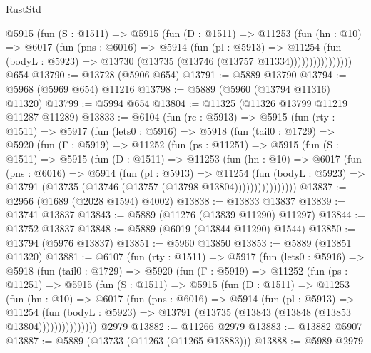 \begin{lexlean}{RustStd}
\begin{coremodule}
                @5915
                  (fun (S : @1511) =>
                  @5915
                    (fun (D : @1511) =>
                    @11253
                      (fun (hn : @10) =>
                      @6017
                        (fun (pns : @6016) =>
                        @5914
                          (fun (pl : @5913) =>
                          @11254
                            (fun (bodyL : @5923) =>
                            @13730 (@13735 (@13746 (@13757 @11334))))))))))))))))
    @654
@13790 := @13728 (@5906 @654)
@13791 := @5889 @13790
@13794 := @5968 (@5969 @654) @11216
@13798 := @5889 (@5960 (@13794 @11316) @11320)
@13799 := @5994 @654
@13804 := @11325 (@11326 @13799 @11219 @11287 @11289)
@13833 := @6104
    (fun (rc : @5913) =>
    @5915
      (fun (rty : @1511) =>
      @5917
        (fun (lets0 : @5916) =>
        @5918
          (fun (tail0 : @1729) =>
          @5920
            (fun (Γ : @5919) =>
            @11252
              (fun (ps : @11251) =>
              @5915
                (fun (S : @1511) =>
                @5915
                  (fun (D : @1511) =>
                  @11253
                    (fun (hn : @10) =>
                    @6017
                      (fun (pns : @6016) =>
                      @5914
                        (fun (pl : @5913) =>
                        @11254
                          (fun (bodyL : @5923) =>
                          @13791 (@13735 (@13746 (@13757 (@13798 @13804))))))))))))))))
@13837 := @2956 (@1689 (@2028 @1594) @4002)
@13838 := @13833 @13837
@13839 := @13741 @13837
@13843 := @5889 (@11276 (@13839 @11290) @11297)
@13844 := @13752 @13837
@13848 := @5889 (@6019 (@13844 @11290) @1544)
@13850 := @13794 (@5976 @13837)
@13851 := @5960 @13850
@13853 := @5889 (@13851 @11320)
@13881 := @6107
    (fun (rty : @1511) =>
    @5917
      (fun (lets0 : @5916) =>
      @5918
        (fun (tail0 : @1729) =>
        @5920
          (fun (Γ : @5919) =>
          @11252
            (fun (ps : @11251) =>
            @5915
              (fun (S : @1511) =>
              @5915
                (fun (D : @1511) =>
                @11253
                  (fun (hn : @10) =>
                  @6017
                    (fun (pns : @6016) =>
                    @5914
                      (fun (pl : @5913) =>
                      @11254
                        (fun (bodyL : @5923) =>
                        @13791 (@13735 (@13843 (@13848 (@13853 @13804)))))))))))))))
    @2979
@13882 := @11266 @2979
@13883 := @13882 @5907
@13887 := @5889 (@13733 (@11263 (@11265 @13883)))
@13888 := @5989 @2979

\end{coremodule}
\end{lexlean}
